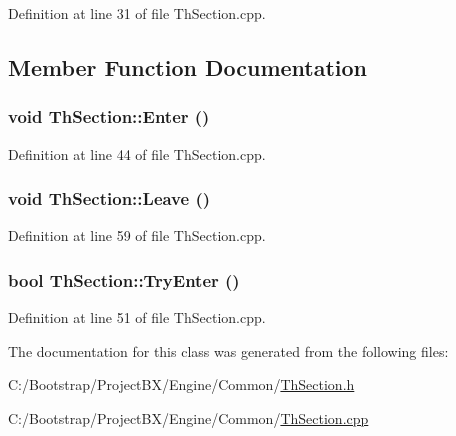 Definition at line 31 of file ThSection.cpp.

\subsection{Member Function Documentation}
\hypertarget{class_th_section_308968cbf58f2c8f4738237b5d5ea180}{
\subsubsection[{Enter}]{\setlength{\rightskip}{0pt plus 5cm}void ThSection::Enter ()}}
\label{class_th_section_308968cbf58f2c8f4738237b5d5ea180}




Definition at line 44 of file ThSection.cpp.\hypertarget{class_th_section_53584ae6470fbb5eac445d53e7f3da51}{
\subsubsection[{Leave}]{\setlength{\rightskip}{0pt plus 5cm}void ThSection::Leave ()}}
\label{class_th_section_53584ae6470fbb5eac445d53e7f3da51}




Definition at line 59 of file ThSection.cpp.\hypertarget{class_th_section_a4d6e04ff8a6ded53a0261d3702b99b1}{
\subsubsection[{TryEnter}]{\setlength{\rightskip}{0pt plus 5cm}bool ThSection::TryEnter ()}}
\label{class_th_section_a4d6e04ff8a6ded53a0261d3702b99b1}




Definition at line 51 of file ThSection.cpp.

The documentation for this class was generated from the following files:\begin{CompactItemize}
\item 
C:/Bootstrap/ProjectBX/Engine/Common/\hyperlink{_th_section_8h}{ThSection.h}\item 
C:/Bootstrap/ProjectBX/Engine/Common/\hyperlink{_th_section_8cpp}{ThSection.cpp}\end{CompactItemize}
